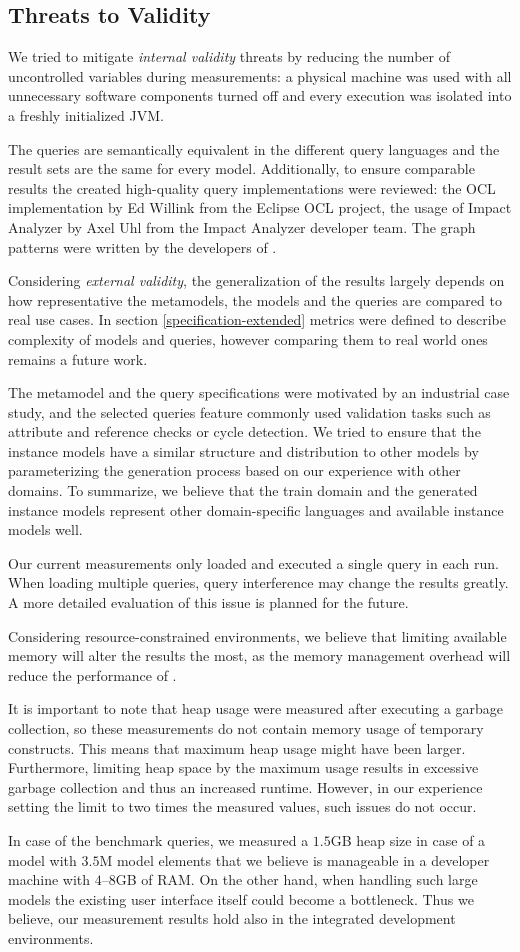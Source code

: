\subsection{Threats to Validity}
We tried to mitigate \emph{internal validity} threats by reducing the number of
uncontrolled variables during measurements: a physical machine was used with all
unnecessary software components turned off and every execution was isolated into
a freshly initialized JVM.

The queries are semantically equivalent in the different query languages and the
result sets are the same for every model. Additionally, to ensure comparable
results the created high-quality query implementations were reviewed: the OCL
implementation by Ed Willink from the Eclipse OCL project, the usage of Impact
Analyzer by Axel Uhl from the Impact Analyzer developer team. The graph patterns
were written by the developers of \incquery{}.

Considering \emph{external validity}, the generalization of the results largely
depends on how representative the metamodels, the models and the queries are
compared to real use cases. In section \ref{specification-extended} metrics were
defined to describe complexity of models and queries, however comparing them to
real world ones remains a future work.

The metamodel and the query specifications were motivated by an industrial case
study, and the selected queries feature commonly used validation tasks such as
attribute and reference checks or cycle detection. We tried to ensure that the
instance models have a similar structure and distribution to other models by
parameterizing the generation process based on our experience with other
domains. To summarize, we believe that the train domain and the generated
instance models represent other domain-specific languages and available instance
models well.

Our current measurements only loaded and executed a single query in each run.
When loading multiple queries, query interference may change the results
greatly. A more detailed evaluation of this issue is planned for the future.

Considering resource-constrained environments, we believe that limiting
available memory will alter the results the most, as the memory management
overhead will reduce the performance of \incquery{}.

It is important to note that heap usage were measured after executing a garbage
collection, so these measurements do not contain memory usage of temporary
constructs. This means that maximum heap usage might have been larger. Furthermore,
limiting heap space by the maximum usage results in excessive garbage collection
and thus an increased runtime. However, in our experience setting the limit to
two times the measured values, such issues do not occur.

In case of the benchmark queries, we measured a $1.5$GB heap size in case of a
model with $3.5$M model elements that we believe is manageable in a developer
machine with $4$--$8$GB of RAM. On the other hand, when handling such large
models the existing user interface itself could become a bottleneck. Thus we
believe, our measurement results hold also in the integrated development
environments.
